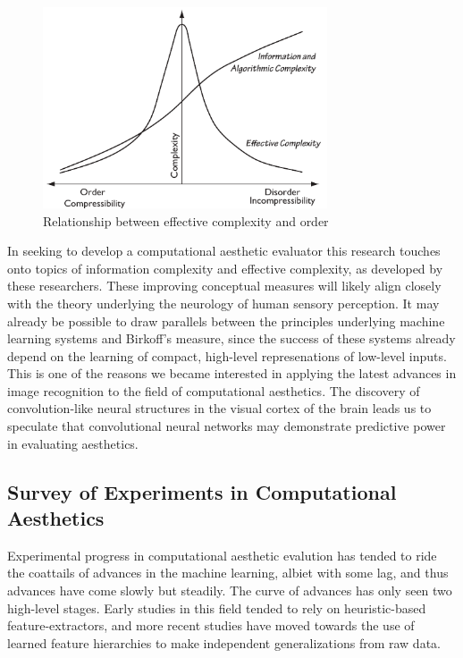 \documentclass[midd]{thesis}
\begin{document}
\begin{figure}
\centering
\includegraphics[width=0.75\textwidth]{figures/effectivecomplexity.pdf}
\caption{Relationship between effective complexity and order}
\label{fig:effectivecomplexity}
\end{figure}

In seeking to develop a computational aesthetic evaluator this research touches onto topics of information complexity and effective complexity, as developed by these researchers. These improving conceptual measures will likely align closely with the theory underlying the neurology of human sensory perception. It may already be possible to draw parallels between the principles underlying machine learning systems and Birkoff's measure, since the success of these systems already depend on the learning of compact, high-level represenations of low-level inputs. This is one of the reasons we became interested in applying the latest advances in image recognition to the field of computational aesthetics. The discovery of convolution-like neural structures in the visual cortex of the brain leads us to speculate that convolutional neural networks may demonstrate predictive power in evaluating aesthetics.


\subsection{Survey of Experiments in Computational Aesthetics}

Experimental progress in computational aesthetic evalution has tended to ride the coattails of advances in the machine learning, albiet with some lag, and thus advances have come slowly but steadily. The curve of advances has only seen two high-level stages. Early studies in this field tended to rely on heuristic-based feature-extractors, and more recent studies have moved towards the use of learned feature hierarchies to make independent generalizations from raw data.
\end{document}

